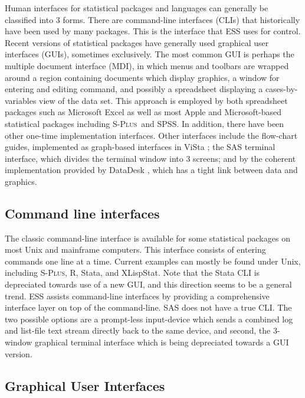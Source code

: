 \documentclass{article}
\newcommand*{\Splus}{\textsc{S-Plus}}
\begin{document}
Human interfaces for statistical packages and languages can generally
be classified into 3 forms.  There are command-line interfaces (CLIs)
that historically have been used by many packages.  This is the
interface that ESS uses for control.  Recent versions of statistical
packages have generally used graphical user interfaces (GUIs),
sometimes exclusively.  The most common GUI is perhaps the multiple
document interface (MDI), in which menus and toolbars are wrapped
around a region containing documents which display graphics, a window
for entering and editing command, and possibly a spreadsheet
displaying a cases-by-variables view of the data set.  This approach
is employed by both spreadsheet packages such as Microsoft Excel as
well as most Apple and Microsoft-based statistical packages including
\Splus\ and SPSS.  In addition, there have been other one-time
implementation interfaces.  Other interfaces include the flow-chart
guides, implemented as graph-based interfaces in ViSta
\citep{youn:lubi:1995}; the SAS terminal interface, which divides the
terminal window into 3 screens; and by the coherent implementation
provided by DataDesk \citep{vell:prat:1989}, which has a tight link
between data and graphics.

\subsection{Command line interfaces}
\label{sec:UI:command}

The classic command-line interface is available for some statistical
packages on most Unix and mainframe computers.  This interface consists
of entering commands one line at a time.  Current examples can mostly be
found under Unix, including \Splus, R, Stata, and XLispStat.  Note that
the Stata CLI is depreciated towards use of a new GUI, and this
direction seems to be a general trend.  ESS assists command-line
interfaces by providing a comprehensive interface layer on top of the
command-line.  SAS does not have a true CLI.  The two possible options
are a prompt-less input-device which sends a combined log and list-file
text stream directly back to the same device, and second, the 3-window
graphical terminal interface which is being depreciated towards a GUI
version.

\subsection{Graphical User Interfaces}
\label{sec:UI:GUI}
\end{document}
